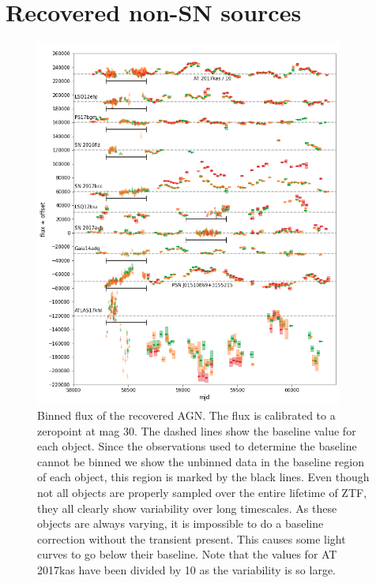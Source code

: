 \documentclass[a4paper,oneside,12pt, class=Latex/Classes/PhDthesisPSnPDF, crop=false]{standalone}
\begin{document}
\section{Recovered non-SN sources}
\begin{figure}
    \centering
    \includegraphics[width=0.9\textwidth]{../Images/chapter_4/non-transients_AGN.png}
    \caption{Binned flux of the recovered AGN. The flux is calibrated to a zeropoint at mag 30. The dashed lines show the baseline value for each object. Since the observations used to determine the baseline cannot be binned we show the unbinned data in the baseline region of each object, this region is marked by the black lines. Even though not all objects are properly sampled over the entire lifetime of ZTF, they all clearly show variability over long timescales. As these objects are always varying, it is impossible to do a baseline correction without the transient present. This causes some light curves to go below their baseline. Note that the values for AT 2017kas have been divided by 10 as the variability is so large.}
    \label{non-transients_AGN}
\end{figure}
\end{document}
